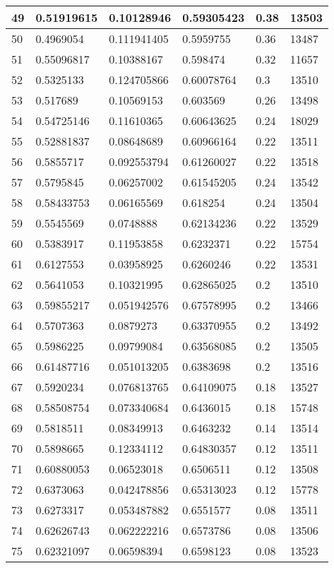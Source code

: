 \begin{longtable}{|l|l|l|l|l|l|}
49 & 0.51919615 & 0.10128946 & 0.59305423 & 0.38 & 13503 \\ \hline 
50 & 0.4969054 & 0.111941405 & 0.5959755 & 0.36 & 13487 \\ \hline 
51 & 0.55096817 & 0.10388167 & 0.598474 & 0.32 & 11657 \\ \hline 
52 & 0.5325133 & 0.124705866 & 0.60078764 & 0.3 & 13510 \\ \hline 
53 & 0.517689 & 0.10569153 & 0.603569 & 0.26 & 13498 \\ \hline 
54 & 0.54725146 & 0.11610365 & 0.60643625 & 0.24 & 18029 \\ \hline 
55 & 0.52881837 & 0.08648689 & 0.60966164 & 0.22 & 13511 \\ \hline 
56 & 0.5855717 & 0.092553794 & 0.61260027 & 0.22 & 13518 \\ \hline 
57 & 0.5795845 & 0.06257002 & 0.61545205 & 0.24 & 13542 \\ \hline 
58 & 0.58433753 & 0.06165569 & 0.618254 & 0.24 & 13504 \\ \hline 
59 & 0.5545569 & 0.0748888 & 0.62134236 & 0.22 & 13529 \\ \hline 
60 & 0.5383917 & 0.11953858 & 0.6232371 & 0.22 & 15754 \\ \hline 
61 & 0.6127553 & 0.03958925 & 0.6260246 & 0.22 & 13531 \\ \hline 
62 & 0.5641053 & 0.10321995 & 0.62865025 & 0.2 & 13510 \\ \hline 
63 & 0.59855217 & 0.051942576 & 0.67578995 & 0.2 & 13466 \\ \hline 
64 & 0.5707363 & 0.0879273 & 0.63370955 & 0.2 & 13492 \\ \hline 
65 & 0.5986225 & 0.09799084 & 0.63568085 & 0.2 & 13505 \\ \hline 
66 & 0.61487716 & 0.051013205 & 0.6383698 & 0.2 & 13516 \\ \hline 
67 & 0.5920234 & 0.076813765 & 0.64109075 & 0.18 & 13527 \\ \hline 
68 & 0.58508754 & 0.073340684 & 0.6436015 & 0.18 & 15748 \\ \hline 
69 & 0.5818511 & 0.08349913 & 0.6463232 & 0.14 & 13514 \\ \hline 
70 & 0.5898665 & 0.12334112 & 0.64830357 & 0.12 & 13511 \\ \hline 
71 & 0.60880053 & 0.06523018 & 0.6506511 & 0.12 & 13508 \\ \hline 
72 & 0.6373063 & 0.042478856 & 0.65313023 & 0.12 & 15778 \\ \hline 
73 & 0.6273317 & 0.053487882 & 0.6551577 & 0.08 & 13511 \\ \hline 
74 & 0.62626743 & 0.062222216 & 0.6573786 & 0.08 & 13506 \\ \hline 
75 & 0.62321097 & 0.06598394 & 0.6598123 & 0.08 & 13523 \\ \hline 
\end{longtable}